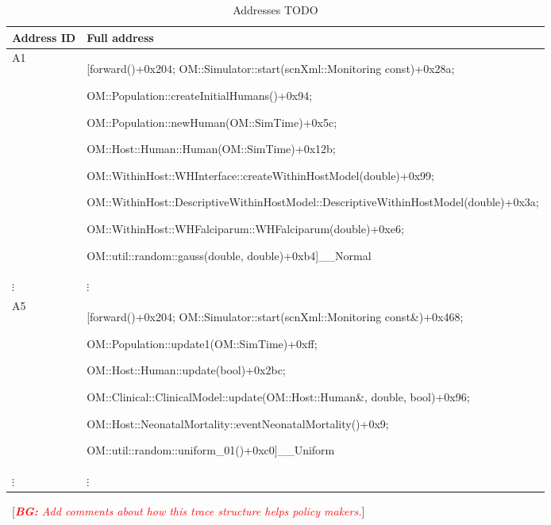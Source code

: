 \documentclass{article}
\newcommand{\bg}[1]{~{{[{\it \textcolor{red}{{\bf BG:} #1}}]}}}
\begin{document}
 \begin{table}[h!]
  \footnotesize
  \setlength{\tabcolsep}{1mm}
  \caption{Addresses TODO }
  \label{table:addresses}
  \def\arraystretch{1.25}
  \begin{tabularx}{\textwidth}{@{}lX@{}} 
    \toprule
    Address ID & Full address \\
    \midrule
  A1 & [forward()+0x204; OM::Simulator::start(scnXml::Monitoring const)+0x28a;

  OM::Population::createInitialHumans()+0x94;

  OM::Population::newHuman(OM::SimTime)+0x5c;

  OM::Host::Human::Human(OM::SimTime)+0x12b;

  OM::WithinHost::WHInterface::createWithinHostModel(double)+0x99;

  OM::WithinHost::DescriptiveWithinHostModel::DescriptiveWithinHostModel(double)+0x3a;

  OM::WithinHost::WHFalciparum::WHFalciparum(double)+0xe6;

  OM::util::random::gauss(double, double)+0xb4]\_\_Normal\\

   $\vdots$ & $\vdots$ \\
  A5 & [forward()+0x204; OM::Simulator::start(scnXml::Monitoring const\&)+0x468;

   OM::Population::update1(OM::SimTime)+0xff;

    OM::Host::Human::update(bool)+0x2bc;

    OM::Clinical::ClinicalModel::update(OM::Host::Human\&, double, bool)+0x96;

    OM::Host::NeonatalMortality::eventNeonatalMortality()+0x9;

    OM::util::random::uniform\_01()+0xc0]\_\_Uniform\\


 $\vdots$ & $\vdots$ \\

\bottomrule
  \end{tabularx}
  \end{table}

\bg{Add comments about how this trace structure helps policy makers.}


\end{document}
